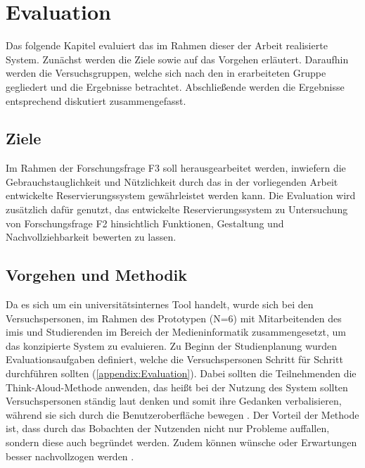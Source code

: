 
\chapter{Evaluation}
\label{chapter-evaluation}
Das folgende Kapitel evaluiert das im Rahmen dieser der Arbeit realisierte System. Zunächst werden
die Ziele sowie auf das Vorgehen erläutert. Daraufhin werden die Versuchsgruppen, welche sich nach
den in  erarbeiteten Gruppe gegliedert und die Ergebnisse betrachtet.
Abschließende werden die Ergebnisse entsprechend diskutiert zusammengefasst.

\section{Ziele}
Im Rahmen der Forschungsfrage F3 soll herausgearbeitet werden, inwiefern die Gebrauchstauglichkeit
und Nützlichkeit durch das in der vorliegenden Arbeit entwickelte Reservierungssystem gewährleistet
werden kann. Die Evaluation wird zusätzlich dafür genutzt, das entwickelte Reservierungssystem zu
Untersuchung von Forschungsfrage F2 hinsichtlich Funktionen, Gestaltung und Nachvollziehbarkeit
bewerten zu lassen.


\section{Vorgehen und Methodik}
Da es sich um ein universitätsinternes Tool handelt, wurde sich bei den Versuchspersonen, im Rahmen
des Prototypen (N=6) mit Mitarbeitenden des \ac{imis} und Studierenden im Bereich der
Medieninformatik zusammengesetzt, um das konzipierte System zu evaluieren. Zu Beginn der
Studienplanung wurden Evaluationsaufgaben definiert, welche die Versuchspersonen Schritt für Schritt
durchführen sollten (\ref{appendix:Evaluation}). Dabei sollten die Teilnehmenden die
Think-Aloud-Methode anwenden, das heißt bei der Nutzung des System sollten Versuchspersonen ständig
laut denken und somit ihre Gedanken verbalisieren, während sie sich durch die Benutzeroberfläche
bewegen \cite{nielsen_usability_1994}. Der Vorteil der Methode ist, dass durch das Bobachten der
Nutzenden nicht nur Probleme auffallen, sondern diese auch begründet werden. Zudem können wünsche
oder Erwartungen besser nachvollzogen werden \cite{nielsen_think}.

